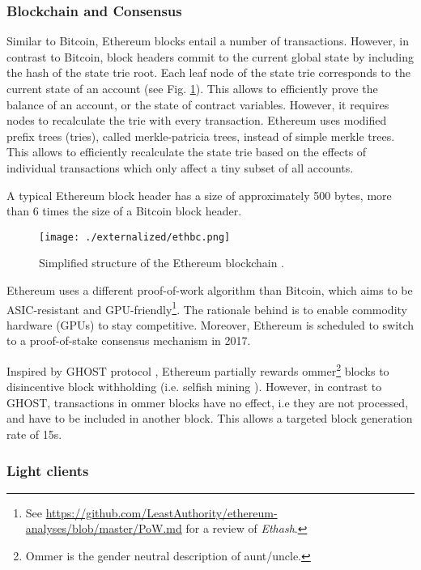 \subsubsection{Blockchain and Consensus}
\label{sec:eth_blockchain}

Similar to Bitcoin, Ethereum blocks entail a number of transactions. However, in contrast to Bitcoin, block headers commit to the current global state by including the hash of the state trie root. Each leaf node of the state trie corresponds to the current state of an account (see Fig. \ref{fig:ethbc}). This allows to efficiently prove the balance of an account, or the state of contract variables. However, it requires nodes to recalculate the trie with every transaction. Ethereum uses modified prefix trees (tries), called merkle-patricia trees, instead of simple merkle trees. This allows to efficiently recalculate the state trie based on the effects of individual transactions which only affect a tiny subset of all accounts.

A typical Ethereum block header has a size of approximately 500 bytes, more than 6 times the size of a Bitcoin block header.


\begin{figure}[!t]
    \centering
    \texttt{[image: ./externalized/ethbc.png]}
    \caption{Simplified structure of the Ethereum blockchain \parencite{EthDevTut}.}
    \label{fig:ethbc}
  \end{figure} 

 Ethereum uses a different proof-of-work algorithm than Bitcoin, which aims to be \ac{ASIC}-resistant and \ac{GPU}-friendly\footnote{See \url{https://github.com/LeastAuthority/ethereum-analyses/blob/master/PoW.md} for a review of \emph{Ethash}.}. The rationale behind is to enable commodity hardware (GPUs) to stay competitive. Moreover, Ethereum is scheduled to switch to a proof-of-stake consensus mechanism in 2017. 

Inspired by \ac{GHOST} protocol \parencite{cryptoeprint:2013:881}, Ethereum partially rewards ommer\footnote{Ommer is the gender neutral description of aunt/uncle.} blocks to disincentive block withholding (i.e. selfish mining \parencite{Eyal2014}). However, in contrast to \ac{GHOST}, transactions in ommer blocks have no effect, i.e they are not processed, and have to be included in another block. This allows a targeted block generation rate of 15s.  

\subsubsection{Light clients}
\label{sec:eth_lightclient}

